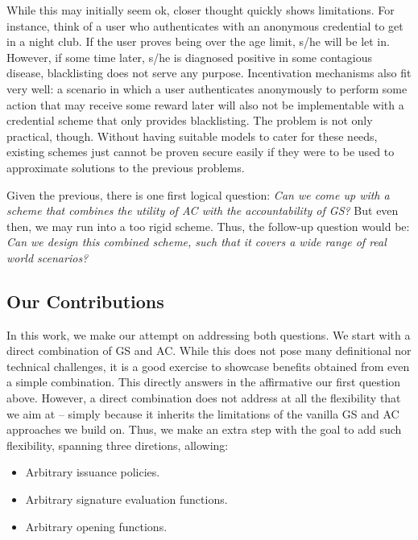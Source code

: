 While this may initially seem ok, closer thought quickly shows limitations. For
instance, think of a user who authenticates with an anonymous credential to get
in a night club. If the user proves being over the age limit, s/he will be let
in. However, if some time later, s/he is diagnosed positive in some contagious
disease, blacklisting does not serve any purpose. Incentivation mechanisms also
fit very well: a scenario in which a user authenticates anonymously to perform
some action that may receive some reward later will also not be implementable
with a credential scheme that only provides blacklisting. The problem is not
only practical, though. Without having suitable models to cater for these needs,
existing schemes just cannot be proven secure easily if they were to be used
to approximate solutions to the previous problems.

Given the previous, there is one first logical question: \emph{Can we come up
  with a scheme that combines the utility of AC with the accountability of
  GS?} But even then, we may run into a too rigid scheme. Thus, the follow-up
question would be: \emph{Can we design this combined scheme, such that it covers
a wide range of real world scenarios?}


\subsection{Our Contributions}
\label{ssec:contributions}

In this work, we make our attempt on addressing both questions. We start with a
direct combination of GS and AC. While this does not pose many definitional nor
technical challenges, it is a good exercise to showcase benefits obtained from
even a simple combination. This directly answers in the affirmative our first
question above. However, a direct combination does not address at all the
flexibility that we aim at -- simply because it inherits the limitations of
the vanilla GS and AC approaches we build on. Thus, we make an extra step with
the goal to add such flexibility, spanning three diretions, allowing:

\begin{itemize}
\item Arbitrary issuance policies.
\item Arbitrary signature evaluation functions.
\item Arbitrary opening functions.
\end{itemize}

